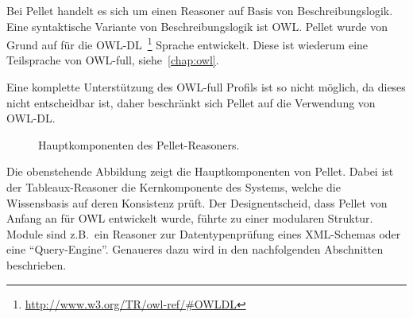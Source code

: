 Bei Pellet handelt es sich um einen Reasoner auf Basis von Beschreibungslogik. Eine syntaktische Variante von Beschreibungslogik ist OWL. Pellet wurde von Grund auf für die OWL-DL~\footnote{\url{http://www.w3.org/TR/owl-ref/\#OWLDL}} Sprache entwickelt. Diese ist wiederum eine Teilsprache von OWL-full, siehe~\autoref{chap:owl}.

Eine komplette Unterstützung des OWL-full Profils ist so nicht möglich, da dieses nicht entscheidbar ist, daher beschränkt sich Pellet auf die Verwendung von OWL-DL\@.~\cite[Seite 13]{sirin:pellet05}

\begin{figure}[htbp]
\centering {}
\caption{Hauptkomponenten des Pellet-Reasoners.\label{fig:pellet_komponenten}\protect\footnotemark}
\end{figure}

Die obenstehende Abbildung zeigt die Hauptkomponenten von Pellet. Dabei ist der Tableaux-Reasoner die Kernkomponente des Systems, welche die Wissensbasis auf deren Konsistenz prüft. Der Designentscheid, dass Pellet von Anfang an für OWL entwickelt wurde, führte zu einer modularen Struktur. Module sind z.B.\ ein Reasoner zur Datentypenprüfung eines XML-Schemas oder eine ``Query-Engine''. Genaueres dazu wird in den nachfolgenden Abschnitten beschrieben.

